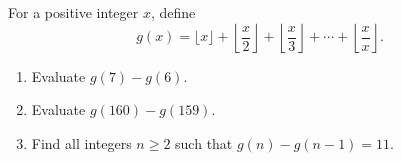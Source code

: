 For a positive integer $x$, define
\[g(x)=\lfloor x\rfloor+\left\lfloor\dfrac x2\right\rfloor+\left\lfloor\dfrac x3\right\rfloor+\cdots+\left\lfloor\dfrac xx\right\rfloor.\]
\begin{enumerate}
\item[(a)] Evaluate $g(7)-g(6)$.
\item[(b)] Evaluate $g(160)-g(159)$.
\item[(c)] Find all integers $n\ge2$ such that $g(n)-g(n-1)=11$.
\end{enumerate}

